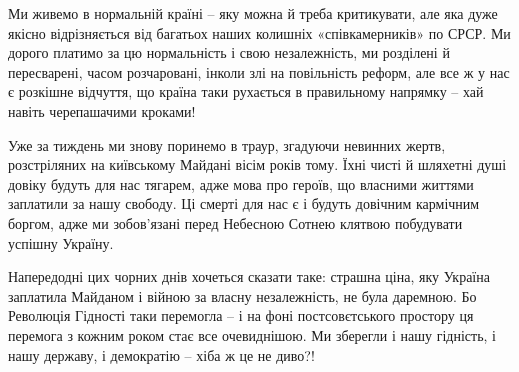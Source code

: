 Ми живемо в нормальній країні – яку можна й треба критикувати, але яка дуже
якісно відрізняється від багатьох наших колишніх «співкамерників» по СРСР. Ми
дорого платимо за цю нормальність і свою незалежність, ми розділені й
пересварені, часом розчаровані, інколи злі на повільність реформ, але все ж у
нас є розкішне відчуття, що країна таки рухається в правильному напрямку – хай
навіть черепашачими кроками!

Уже за тиждень ми знову поринемо в траур, згадуючи невинних жертв, розстріляних
на київському Майдані вісім років тому. Їхні чисті й шляхетні душі довіку
будуть для нас тягарем, адже мова про героїв, що власними життями заплатили за
нашу свободу. Ці смерті для нас є і будуть довічним кармічним боргом, адже ми
зобов’язані перед Небесною Сотнею клятвою побудувати успішну Україну.

Напередодні цих чорних днів хочеться сказати таке: страшна ціна, яку Україна
заплатила Майданом і війною за власну незалежність, не була даремною. Бо
Революція Гідності таки перемогла – і на фоні постсовєтського простору ця
перемога з кожним роком стає все  очевиднішою. Ми зберегли і нашу гідність, і
нашу державу, і демократію – хіба ж це не диво?!

